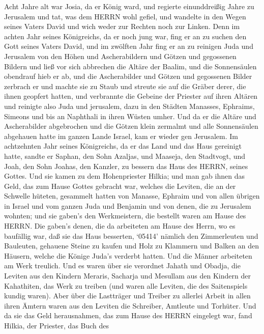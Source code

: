  Acht Jahre alt war Josia, da er König ward, und regierte
einunddreißig Jahre zu Jerusalem  und tat, was dem HERRN
wohl gefiel, und wandelte in den Wegen seines Vaters David und wich
weder zur Rechten noch zur Linken.  Denn im achten Jahr
seines Königreichs, da er noch jung war, fing er an zu suchen den Gott
seines Vaters David, und im zwölften Jahr fing er an zu reinigen Juda
und Jerusalem von den Höhen und Ascherabildern und Götzen und gegossenen
Bildern  und ließ vor sich abbrechen die Altäre der Baalim,
und die Sonnensäulen obendrauf hieb er ab, und die Ascherabilder und
Götzen und gegossenen Bilder zerbrach er und machte sie zu Staub und
streute sie auf die Gräber derer, die ihnen geopfert hatten,
 und verbrannte die Gebeine der Priester auf ihren Altären
und reinigte also Juda und jerusalem,  dazu in den Städten
Manasses, Ephraims, Simeons und bis an Naphthali in ihren Wüsten umher.
 Und da er die Altäre und Ascherabilder abgebrochen und die
Götzen klein zermalmt und alle Sonnensäulen abgehauen hatte im ganzen
Lande Israel, kam er wieder gen Jerusalem.  Im achtzehnten
Jahr seines Königreichs, da er das Land und das Haus gereinigt hatte,
sandte er Saphan, den Sohn Azaljas, und Maaseja, den Stadtvogt, und
Joah, den Sohn Joahas, den Kanzler, zu bessern das Haus des HERRN,
seines Gottes.  Und sie kamen zu dem Hohenpriester Hilkia;
und man gab ihnen das Geld, das zum Hause Gottes gebracht war, welches
die Leviten, die an der Schwelle hüteten, gesammelt hatten von Manasse,
Ephraim und von allen übrigen in Israel und vom ganzen Juda und Benjamin
und von denen, die zu Jerusalem wohnten;  und sie gaben's
den Werkmeistern, die bestellt waren am Hause des HERRN. Die gaben's
denen, die da arbeiteten am Hause des Herrn, wo es baufällig war, daß
sie das Haus besserten,  `05414' nämlich den Zimmerleuten
und Bauleuten, gehauene Steine zu kaufen und Holz zu Klammern und Balken
an den Häusern, welche die Könige Juda's verderbt hatten. 
Und die Männer arbeiteten am Werk treulich. Und es waren über sie
verordnet Jahath und Obadja, die Leviten aus den Kindern Meraris,
Sacharja und Mesullam aus den Kindern der Kahathiten, das Werk zu
treiben (und waren alle Leviten, die des Saitenspiels kundig waren).
 Aber über die Lastträger und Treiber zu allerlei Arbeit in
allen ihren Ämtern waren aus den Leviten die Schreiber, Amtleute und
Torhüter.  Und da sie das Geld herausnahmen, das zum Hause
des HERRN eingelegt war, fand Hilkia, der Priester, das Buch des
